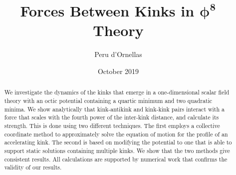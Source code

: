 \documentclass[11pt, oneside]{article}  	%
\title{\textbf{Forces Between Kinks in $\boldsymbol \phi^\textbf{8}$ Theory}}
\date{\small October 2019}
\author[1]{Peru d'Ornellas}
\affil[1]{\small Blackett Laboratory, Imperial College London, London SW7 2AZ, United Kingdom}
\numberwithin{equation}{section}
\begin{document}
\maketitle

\begin{abstract}
    We investigate the dynamics of the kinks that emerge in a one-dimensional scalar field theory with an octic potential containing a quartic minimum and two quadratic minima. We show analytically that kink-antikink and kink-kink pairs interact with a force that scales with the fourth power of the inter-kink distance, and calculate its strength. This is done using two different techniques. The first employs a collective coordinate method to approximately solve the equation of motion for the profile of an accelerating kink. The second is based on modifying the potential to one that is able to support static solutions containing multiple kinks. We show that the two methods give consistent results. All calculations are supported by numerical work that confirms the validity of our results.
\end{abstract}
\end{document}

